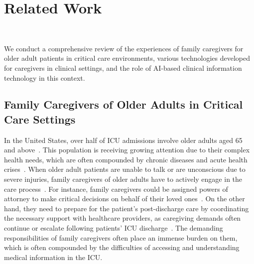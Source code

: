 \section{Related Work}
~\label{relatedwork}

We conduct a comprehensive review of the experiences of family caregivers for older adult patients in critical care environments, various technologies developed for caregivers in clinical settings, and the role of AI-based clinical information technology in this context.
\subsection{Family Caregivers of Older Adults in Critical Care Settings}

In the United States, over half of ICU admissions involve older adults aged 65 and above~\cite{flaatten2017status}. 
This population is receiving growing attention due to their complex health needs, which are often compounded by chronic diseases and acute health crises~\cite{jarvis2023physical}. 
When older adult patients are unable to talk or are unconscious due to severe injuries, family caregivers of older adults have to actively engage in the care process~\cite{au2017family, johnson1995perceived}.
For instance, family caregivers could be assigned powers of attorney to make critical decisions on behalf of their loved ones~\cite{hines2011effectiveness}.
On the other hand, they need to prepare for the patient’s post-discharge care by coordinating the necessary support with healthcare providers, as caregiving demands often continue or escalate following patients' ICU discharge~\cite{choi2014fatigue}. 
The demanding responsibilities of family caregivers often place an immense burden on them, which is often compounded by the difficulties of accessing and understanding medical information in the ICU.



